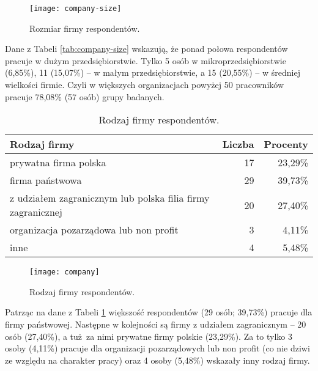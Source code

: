 \begin{figure}[htb]
\begin{center}
\texttt{[image: company-size]}
\end{center}
\caption{Rozmiar firmy respondentów.}
\label{fig:company-size}
\end{figure}

Dane z Tabeli \ref{tab:company-size} wskazują, że ponad połowa respondentów pracuje w dużym przedsiębiorstwie. Tylko 5 osób w mikroprzedsiębiorstwie (6,85\%), 11 (15,07\%) -- w małym przedsiębiorstwie, a 15 (20,55\%) -- w średniej wielkości firmie. Czyli w większych organizacjach powyżej 50 pracowników pracuje 78,08\% (57 osób) grupy badanych.

\begin{table}[h!]
\begin{center}
\begin{tabular}{l r r}
Rodzaj firmy & Liczba & Procenty \\ \hline
prywatna firma polska & 17 & 23,29\% \\
firma państwowa & 29 & 39,73\% \\
z udziałem zagranicznym lub polska filia firmy zagranicznej & 20 & 27,40\% \\
organizacja pozarządowa lub non profit & 3 & 4,11\% \\
inne & 4 & 5,48\% \\
\end{tabular}
\end{center}
\caption{Rodzaj firmy respondentów.}
\label{tab:company}
\end{table}

\begin{figure}[htb]
\begin{center}
\texttt{[image: company]}
\end{center}
\caption{Rodzaj firmy respondentów.}
\label{fig:company}
\end{figure}

Patrząc na dane z Tabeli \ref{tab:company} większość respondentów (29 osób; 39,73\%) pracuje dla firmy państwowej. Następne w kolejności są firmy z udziałem zagranicznym -- 20 osób (27,40\%), a tuż za nimi prywatne firmy polskie (23,29\%). Za to tylko 3 osoby (4,11\%) pracuje dla organizacji pozarządowych lub non profit (co nie dziwi ze względu na charakter pracy) oraz 4 osoby (5,48\%) wskazały inny rodzaj firmy.
\FloatBarrier
